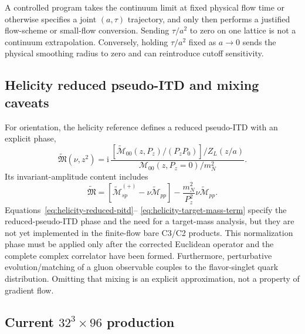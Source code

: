 \documentclass[11pt]{article}
\numberwithin{equation}{section}
\newcommand{\ii}{\mathrm{i}}
\begin{document}
A controlled program takes the continuum limit at fixed physical flow time
or otherwise specifies a joint \((a,\tau)\) trajectory, and only then performs
a justified flow-scheme or small-flow conversion.  Sending \(\tau/a^2\) to
zero on one lattice is not a continuum extrapolation.  Conversely, holding
\(\tau/a^2\) fixed as \(a\to0\) sends the physical smoothing radius to zero
and can reintroduce cutoff sensitivity.

\subsection{Helicity reduced pseudo-ITD and mixing caveats}

For orientation, the helicity reference defines a reduced pseudo-ITD with an
explicit phase,
\begin{equation}
 \widetilde{\mathfrak M}(\nu,z^2)
 =\ii\,
 \frac{[\widetilde{\mathcal M}_{00}(z,P_z)/(P_zP_0)]/Z_L(z/a)}
      {\mathcal M_{00}(z,P_z=0)/m_N^2}.
 \label{eq:helicity-reduced-pitd}
\end{equation}
Its invariant-amplitude content includes
\begin{equation}
 \widetilde{\mathfrak M}
 =\left[\widetilde{\mathcal M}_{sp}^{(+)}
       -\nu\widetilde{\mathcal M}_{pp}\right]
 -\frac{m_N^2}{P_z^2}\nu\widetilde{\mathcal M}_{pp}.
 \label{eq:helicity-target-mass-term}
\end{equation}
Equations~\eqref{eq:helicity-reduced-pitd}--
\eqref{eq:helicity-target-mass-term} specify the reduced-pseudo-ITD phase and
the need for a target-mass analysis, but they are not yet implemented in the
finite-flow bare C3/C2 products.  This normalization phase must be applied only after the corrected
Euclidean operator and the complete complex correlator have been formed.
Furthermore, perturbative evolution/matching of a gluon observable couples to
the flavor-singlet quark distribution.  Omitting that mixing is an explicit
approximation, not a property of gradient flow.

\subsection{Current \texorpdfstring{\(32^3\times96\)}{32x96} production}
\end{document}
